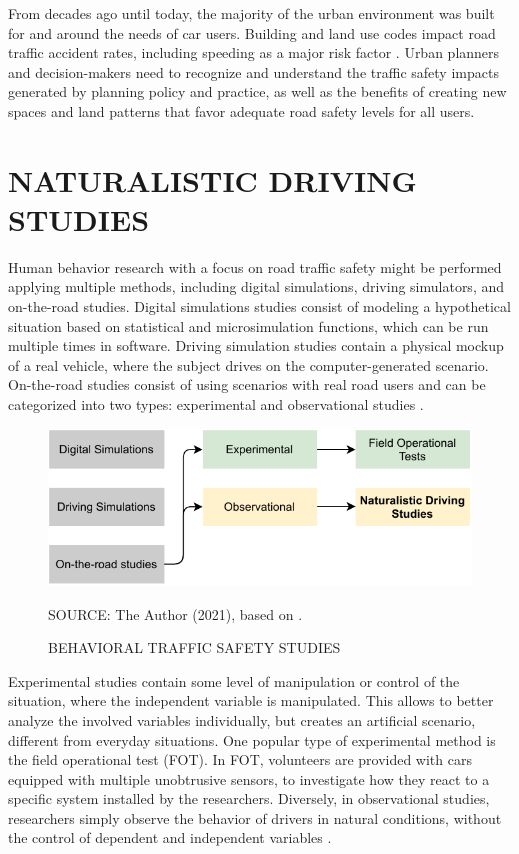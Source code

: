 
From decades ago until today, the majority of the urban environment was built for and around the needs of car users. Building and land use codes impact road traffic accident rates, including speeding as a major risk factor \cite{Knoflacher2016}. Urban planners and decision-makers need to recognize and understand the traffic safety impacts generated by planning policy and practice, as well as the benefits of creating new spaces and land patterns that favor adequate road safety levels for all users. 

\section{NATURALISTIC DRIVING STUDIES} \label{nds}

Human behavior research with a focus on road traffic safety might be performed applying multiple methods, including digital simulations, driving simulators, and on-the-road studies. Digital simulations studies consist of modeling a hypothetical situation based on statistical and microsimulation functions, which can be run multiple times in software. Driving simulation studies contain a physical mockup of a real vehicle, where the subject drives on the computer-generated scenario. On-the-road studies consist of using scenarios with real road users and can be categorized into two types: experimental and observational studies \cite{Shinar2017}. 

\begin{figure}[!htbp]
    \centering\footnotesize
    \captionsetup{font=footnotesize}
    \caption{BEHAVIORAL TRAFFIC SAFETY STUDIES}
    \includegraphics{fig/studies.pdf}
    \label{fig:shinar}
    \par SOURCE: The Author (2021), based on \textcite{Shinar2017}.
\end{figure}

Experimental studies contain some level of manipulation or control of the situation, where the independent variable is manipulated. This allows to better analyze the involved variables individually, but creates an artificial scenario, different from everyday situations. One popular type of experimental method is the field operational test (FOT). In FOT, volunteers are provided with cars equipped with multiple unobtrusive sensors, to investigate how they react to a specific system installed by the researchers. Diversely, in observational studies, researchers simply observe the behavior of drivers in natural conditions, without the control of dependent and independent variables \cite{Shinar2017}. 

